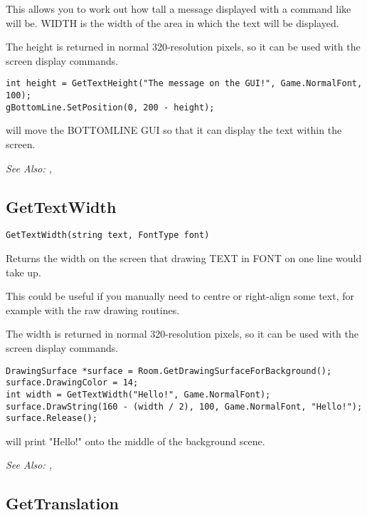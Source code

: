 This allows you to work out how tall a message displayed with a command like
 will be. WIDTH is
the width of the area in which the text will be displayed.

The height is returned in normal 320-resolution pixels, so it can be used with the
screen display commands.

\begin{verbatim}
int height = GetTextHeight("The message on the GUI!", Game.NormalFont, 100);
gBottomLine.SetPosition(0, 200 - height);
\end{verbatim}
will move the BOTTOMLINE GUI so that it can display the text within the screen.

\it{See Also:} , 



\subsection{GetTextWidth}\label{GetTextWidth}%

\begin{verbatim}
GetTextWidth(string text, FontType font)
\end{verbatim}
Returns the width on the screen that drawing TEXT in FONT on one line would take up.

This could be useful if you manually need to centre or right-align some text, for
example with the raw drawing routines.

The width is returned in normal 320-resolution pixels, so it can be used with the
screen display commands.

\begin{verbatim}
DrawingSurface *surface = Room.GetDrawingSurfaceForBackground();
surface.DrawingColor = 14;
int width = GetTextWidth("Hello!", Game.NormalFont);
surface.DrawString(160 - (width / 2), 100, Game.NormalFont, "Hello!");
surface.Release();
\end{verbatim}
will print "Hello!" onto the middle of the background scene.

\it{See Also:} , 


\subsection{GetTranslation}\label{GetTranslation}%

